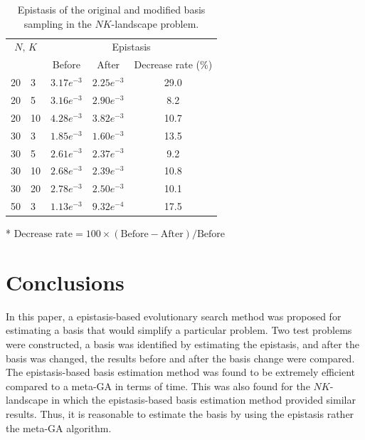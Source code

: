 \begin{table}[H]
	\caption{Epistasis of the original and modified basis sampling in the $NK$-landscape problem.} \label{tab:epi_nk}
	\vspace*{0.2cm}
	\centering
	\begin{threeparttable}
		\begin{tabular}{r@{, }lccc}
			\toprule
			\multicolumn{2}{c}{\multirow{2.5}{*}{$ N,\, K $}} & \multicolumn{3}{c}{Epistasis} \\	\cmidrule(lr){3-5}
			\thead{} & & Before & After & Decrease rate (\%)\tnote{*} \\
			\midrule
			20 & 3	& $ 3.17e^{-3} $ & $ 2.25e^{-3} $ & 29.0    \\
			20 & 5	& $ 3.16e^{-3} $ & $ 2.90e^{-3} $ & { 8.2}  \\
			20 & 10	& $ 4.28e^{-3} $ & $ 3.82e^{-3} $ & 10.7    \\
			30 & 3	& $ 1.85e^{-3} $ & $ 1.60e^{-3} $ & 13.5    \\
			30 & 5	& $ 2.61e^{-3} $ & $ 2.37e^{-3} $ & { 9.2}  \\
			30 & 10	& $ 2.68e^{-3} $ & $ 2.39e^{-3} $ & 10.8    \\
			30 & 20	& $ 2.78e^{-3} $ & $ 2.50e^{-3} $ & 10.1    \\
			50 & 3	& $ 1.13e^{-3} $ & $ 9.32e^{-4} $ & 17.5    \\
			\bottomrule
		\end{tabular}
		\begin{tablenotes}
			\footnotesize
			\item[*] $ \text{Decrease rate} = 100 \times \left( \text{Before} - \text{After} \right) / \text{Before}$
		\end{tablenotes}
	\end{threeparttable}
\end{table}


\section{Conclusions} \label{sec7:conclusions}
In this paper, a epistasis-based evolutionary search method was proposed for estimating a basis that would simplify a particular problem. Two test problems were constructed, a basis was identified by estimating the epistasis, and after the basis was changed, the results before and after the basis change were compared. The epistasis-based basis estimation method was found to be extremely efficient compared to a meta-GA in terms of time. This was also found for the $ NK $-landscape in which the epistasis-based basis estimation method provided similar results. Thus, it is reasonable to estimate the basis by using the epistasis rather the meta-GA algorithm.

